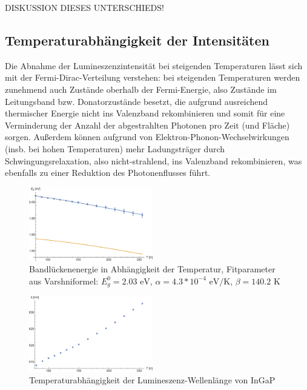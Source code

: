 \documentclass[aps,twocolumn,secnumarabic,nobalancelastpage,amsmath,amssymb,
nofootinbib,superscriptaddress]{revtex4-1}
\begin{document}
DISKUSSION DIESES UNTERSCHIEDS!


\subsection{Temperaturabhängigkeit der Intensitäten}


\noindent Die Abnahme der Lumineszenzintensität bei steigenden Temperaturen lässt sich mit der Fermi-Dirac-Verteilung
verstehen: bei steigenden Temperaturen werden zunehmend auch Zustände oberhalb der Fermi-Energie, also Zustände
im Leitungsband bzw. Donatorzustände besetzt, die aufgrund ausreichend thermischer Energie nicht ins Valenzband
rekombinieren und somit für eine Verminderung der Anzahl der abgestrahlten Photonen pro Zeit (und Fläche) sorgen.
Außerdem können aufgrund von Elektron-Phonon-Wechselwirkungen (insb. bei hohen Temperaturen) mehr Ladungsträger durch
Schwingungsrelaxation, also nicht-strahlend, ins Valenzband rekombinieren, was ebenfalls zu einer Reduktion des
Photonenflusses führt.

\begin{figure}[t]
  \centering
  \includegraphics[width=0.48\textwidth]{../Messung/energtemp.eps}
  \caption{\label{fig:EgapT} Bandlückenenergie in Abhängigkeit der Temperatur, Fitparameter
  aus Varshniformel: $E_g^0= 2.03 \text{ eV}$, $ \alpha = 4.3*10^{-4} \text{ eV/K}$, \quad $ \beta = 140.2 \text{ K}$}
\end{figure}

\begin{figure}[b]
  \centering
  \includegraphics[width=0.48\textwidth]{../Messung/peaktemp.eps}
  \caption{\label{fig:lamT} Temperaturabhängigkeit der Lumineszenz-Wellenlänge von InGaP}
\end{figure}
\end{document}

